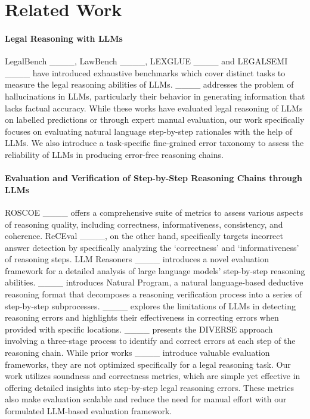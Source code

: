 \section{Related Work}
\label{sec:related_work}
\paragraph{Legal Reasoning with LLMs}
LegalBench ____, LawBench ____, LEXGLUE ____ and LEGALSEMI ____ have introduced exhaustive benchmarks which cover distinct tasks to measure the legal reasoning abilities of LLMs. ____ addresses the problem of hallucinations in LLMs, particularly their behavior in generating information that lacks factual accuracy. While these works have evaluated legal reasoning of LLMs on labelled predictions or through expert manual evaluation, our work specifically focuses on evaluating natural language step-by-step rationales with the help of LLMs. We also introduce a task-specific fine-grained error taxonomy to assess the reliability of LLMs in producing error-free reasoning chains.

\paragraph{Evaluation and Verification of Step-by-Step Reasoning Chains through LLMs}
ROSCOE ____ offers a comprehensive suite of metrics to assess various aspects of reasoning quality, including correctness, informativeness, consistency, and coherence. ReCEval ____, on the other hand, specifically targets incorrect answer detection by specifically analyzing the `correctness' and `informativeness' of reasoning steps. LLM Reasoners ____ introduces a novel evaluation framework for a detailed analysis of large language models’ step-by-step reasoning abilities. ____ introduces Natural Program, a natural language-based deductive reasoning format that decomposes a reasoning verification process into a series of step-by-step subprocesses. ____ explores the limitations of LLMs in detecting reasoning errors and highlights their effectiveness in correcting errors when provided with specific locations. ____ presents the DIVERSE approach involving a three-stage process to identify and correct errors at each step of the reasoning chain. While prior works ____ introduce valuable evaluation frameworks, they are not optimized specifically for a legal reasoning task. Our work utilizes soundness and correctness metrics, which are simple yet effective in offering detailed insights into step-by-step legal reasoning errors. These metrics also make evaluation scalable and reduce the need for manual effort with our formulated LLM-based evaluation framework. 

